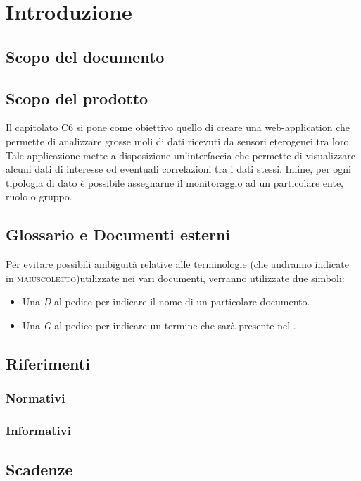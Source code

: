 \section{Introduzione}
	\subsection{Scopo del documento}
	\subsection{Scopo del prodotto}
		Il capitolato C6 si pone come obiettivo quello di creare una web-application che permette di analizzare grosse moli di dati ricevuti da sensori eterogenei tra loro. Tale applicazione mette a disposizione un'interfaccia che permette di visualizzare alcuni dati di interesse od eventuali correlazioni tra i dati stessi. Infine, per ogni tipologia di dato è possibile assegnarne il monitoraggio ad un particolare ente, ruolo o gruppo.
	\subsection{Glossario e Documenti esterni}
		Per evitare possibili ambiguità relative alle terminologie (che andranno indicate in \textsc{maiuscoletto})utilizzate nei vari documenti, verranno utilizzate due simboli:
		\begin{itemize}
			\item Una \textit{D} al pedice per indicare il nome di un particolare documento.
			\item Una \textit{G} al pedice per indicare un termine che sarà presente nel .
		\end{itemize}
	\subsection{Riferimenti}
		\subsubsection{Normativi}
			
		\subsubsection{Informativi}
			

	\subsection{Scadenze}

